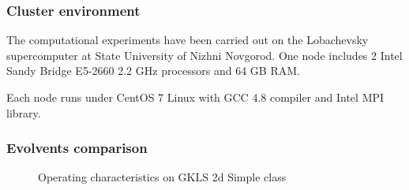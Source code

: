 \documentclass[aspectratio=1610]{beamer}
\begin{document}
\begin{frame}
  \frametitle{Cluster environment}
  \begin{center}

  The computational experiments have been carried out on the Lobachevsky supercomputer at  State University of Nizhni Novgorod.
  One node includes 2 Intel Sandy Bridge E5-2660 2.2 GHz processors and 64 GB RAM.

  Each node runs under CentOS 7 Linux with GCC 4.8 compiler and Intel MPI library.
\end{center}

\end{frame}

\begin{frame}
  \frametitle{Evolvents comparison}
  \begin{figure}[ht]
    \hspace*{-0.9cm}
     \hspace*{4cm}
    \caption{Operating characteristics on GKLS 2d Simple class}
  \end{figure}
\end{frame}
\end{document}
